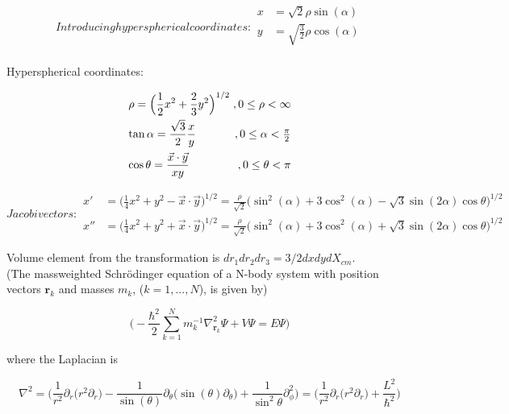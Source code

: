 \documentclass{article}
\begin{document}
\begin{subequations}
Introducing hyperspherical coordinates:
\begin{align}
        x &= \sqrt{2} \rho \sin(\alpha)\\
        y &= \sqrt{\frac{3}{2}} \rho \cos(\alpha)\\
\end{align}
\end{subequations}

Hyperspherical coordinates:
\[\arraycolsep=1.4pt\def\arraystretch{2.2}
     \left. \begin{array}{lr}
        \rho = \displaystyle \Big( \frac{1}{2}x^2 + \frac{2}{3}y^2 \Big) ^{1/2} &,  0\leq \rho < \infty\\
        \tan{\alpha} = \displaystyle \frac{\sqrt{3}}{2} \frac{x}{y} &,  0\leq \alpha < \frac{\pi}{2}\\
        \cos{\theta} = \displaystyle \frac{\vec{x} \cdot \vec{y}}{xy} &,  0\leq \theta < \pi
        \end{array}\right.
  \]

\begin{subequations}
Jacobi vectors:
\begin{align}
        x' &= \Big(\frac{1}{4} x^2 +y^2 -\vec{x} \cdot \vec{y}\Big)^{1/2} = \frac{\rho}{\sqrt{2}} \big( \sin^2(\alpha) + 3\cos^2(\alpha) - \sqrt{3}\sin(2\alpha)\cos{\theta}\big)^{1/2}\\
        x'' &= \Big(\frac{1}{4} x^2 +y^2 +\vec{x} \cdot \vec{y}\Big)^{1/2} = \frac{\rho}{\sqrt{2}} \big( \sin^2(\alpha) + 3\cos^2(\alpha) + \sqrt{3}\sin(2\alpha)\cos{\theta}\big)^{1/2}
\end{align}
\end{subequations}

Volume element from the transformation is $dr_1dr_2dr_3=3/2dxdydX_{cm}$.\\


(The massweighted Schr{\"o}dinger equation of a N-body system with position vectors $\mathbf{r}_k$ and masses $m_k$, ($k=1,...,N$), is given by)

\begin{equation}
\Bigg(-\frac{\hbar^2}{2} \sum_{k=1}^{N} m^{-1}_{k} \nabla^{2}_{\mathbf{r}_{k}} \Psi + V\Psi = E \Psi \Bigg)
\end{equation}

where the Laplacian is

\begin{equation}
\nabla^{2} = \Big( \frac{1}{r^2}\partial_{r} \big(r^2 \partial_{r}\big) - \frac{1}{\sin(\theta)} \partial_{\theta} \big( \sin(\theta) \partial_{\theta} \big) + \frac{1}{\sin^2{\theta}} \partial^{2}_{\phi} \Big) = \Big( \frac{1}{r^2} \partial_{r} \big( r^2 \partial_{r} \big) + \frac{L^2}{\hbar^2} \Big)
\end{equation}
\end{document}

